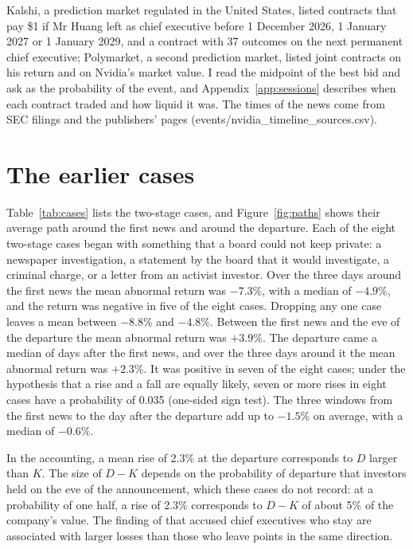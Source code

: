 \documentclass[11pt,a4paper]{article}
\begin{document}
Kalshi, a prediction market regulated in the United States, listed contracts that pay \$1 if Mr Huang left as chief executive before 1 December 2026, 1 January 2027 or 1 January 2029, and a contract with 37 outcomes on the next permanent chief executive; Polymarket, a second prediction market, listed joint contracts on his return and on Nvidia's market value. I read the midpoint of the best bid and ask as the probability of the event, and Appendix~\ref{app:sessions} describes when each contract traded and how liquid it was. The times of the news come from SEC filings and the publishers' pages (events/nvidia\_timeline\_sources.csv).

\section{The earlier cases}\label{sec:cases}

Table~\ref{tab:cases} lists the two-stage cases, and Figure~\ref{fig:paths} shows their average path around the first news and around the departure. Each of the eight two-stage cases began with something that a board could not keep private: a newspaper investigation, a statement by the board that it would investigate, a criminal charge, or a letter from an activist investor. Over the three days around the first news the mean abnormal return was $-7.3$\%, with a median of $-4.9$\%, and the return was negative in five of the eight cases. Dropping any one case leaves a mean between $-8.8$\% and $-4.8$\%. Between the first news and the eve of the departure the mean abnormal return was $+3.9$\%. The departure came a median of \gap{} days after the first news, and over the three days around it the mean abnormal return was $+2.3$\%. It was positive in seven of the eight cases; under the hypothesis that a rise and a fall are equally likely, seven or more rises in eight cases have a probability of 0.035 (one-sided sign test). The three windows from the first news to the day after the departure add up to $-1.5$\% on average, with a median of $-0.6$\%.

In the accounting, a mean rise of 2.3\% at the departure corresponds to $D$ larger than $K$. The size of $D - K$ depends on the probability of departure that investors held on the eve of the announcement, which these cases do not record: at a probability of one half, a rise of 2.3\% corresponds to $D - K$ of about 5\% of the company's value. The finding of \citet{borelli2021} that accused chief executives who stay are associated with larger losses than those who leave points in the same direction.
\end{document}
